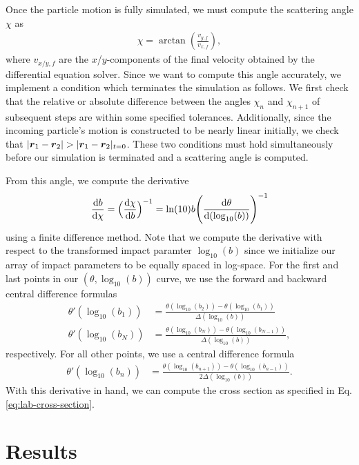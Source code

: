 Once the particle motion is fully simulated, we must compute the scattering angle $\chi$ as
\begin{align}
    \chi = \arctan(\frac{v_{y,f}}{v_{x,f}})
,\end{align}
where $v_{x/y,f}$ are the $x$/$y$-components of the final velocity obtained by the differential equation solver.
Since we want to compute this angle accurately, we implement a condition which terminates the simulation as follows.
We first check that the relative or absolute difference between the angles $\chi_{n}$ and $\chi_{n+1}$ of subsequent steps are within some specified tolerances.
Additionally, since the incoming particle's motion is constructed to be nearly linear initially, we check that $|\vb*{r}_{1} - \vb*{r}_{2}| > |\vb*{r}_{1} - \vb*{r}_{2}|_{t = 0}$.
These two conditions must hold simultaneously before our simulation is terminated and a scattering angle is computed.

From this angle, we compute the derivative
\begin{align}
    \dv{b}{\chi} = \Big( \dv{\chi}{b} \Big)^{-1} = \ln(10) b \Bigg( \dv{\theta}{(\log_{10}(b))} \Bigg)^{-1}
\end{align}
using a finite difference method.
Note that we compute the derivative with respect to the transformed impact paramter $\log_{10}(b)$ since we initialize our array of impact parameters to be equally spaced in log-space.
For the first and last points in our $(\theta,\log_{10}(b))$ curve, we use the forward and backward central difference formulas
\begin{align}
    \theta'(\log_{10}(b_1)) &= \frac{\theta(\log_{10}(b_2)) - \theta(\log_{10}(b_1))}{\Delta(\log_{10}(b))} \\
    \theta'(\log_{10}(b_N)) &= \frac{\theta(\log_{10}(b_N)) - \theta(\log_{10}(b_{N-1}))}{\Delta(\log_{10}(b))}
,\end{align}
respectively.
For all other points, we use a central difference formula
\begin{align}
    \theta'(\log_{10}(b_n)) &= \frac{\theta(\log_{10}(b_{n+1})) - \theta(\log_{10}(b_{n-1}))}{2 \Delta(\log_{10}(b))}
.\end{align}
With this derivative in hand, we can compute the cross section as specified in Eq. \ref{eq:lab-cross-section}.


\section{Results}
\label{sec:results}

